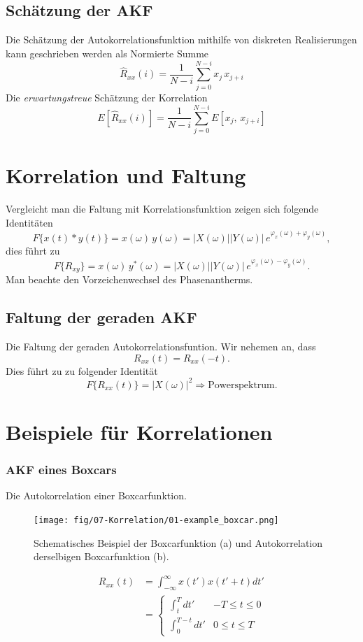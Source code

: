 \subsection{Schätzung der AKF}
Die Schätzung der Autokorrelationsfunktion mithilfe von diskreten Realisierungen kann geschrieben werden als Normierte Summe
\[
\hat R_{xx}(i) = \frac{1}{N-i} \sum_{j=0}^{N-i} x_j\,x_{j+i}
\]
Die \textit{erwartungstreue} Schätzung der Korrelation
\[
E[\hat R_{xx}(i)] = \frac{1}{N-i} \sum_{j=0}^{N-i} E[x_j,\,x_{j+i}]
\]

\section{Korrelation und Faltung}
Vergleicht man die Faltung mit Korrelationsfunktion zeigen sich folgende Identitäten
\[
F\{x(t) \ast y(t)\} = x(\omega)\,y(\omega) = |X(\omega)| |Y(\omega)|\,e^{\varphi_x(\omega) + \varphi_y(\omega)},
\]
dies führt zu
\[
F\{R_{xy}\} = x(\omega)\,y^*(\omega) = |X(\omega)| |Y(\omega)|\,e^{\varphi_x(\omega) - \varphi_y(\omega)}.
\]
Man beachte den Vorzeichenwechsel des Phasenantherms.

\subsection*{Faltung der geraden AKF}
Die Faltung der geraden Autokorrelationsfuntion. Wir nehemen an, dass
\[
R_{xx}(t) = R_{xx}(-t).
\]
Dies führt zu zu folgender Identität
\[
F\{R_{xx}(t)\} = |X(\omega)|^2 \Rightarrow \textrm{Powerspektrum}.
\]

\section{Beispiele für Korrelationen}

\subsubsection*{AKF eines Boxcars}
Die Autokorrelation einer Boxcarfunktion.
\begin{figure}[h!]
\centering
\texttt{[image: fig/07-Korrelation/01-example\_boxcar.png]}
\caption{Schematisches Beispiel der Boxcarfunktion (a) und Autokorrelation derselbigen Boxcarfunktion (b).}
\end{figure}
\begin{align*}
R_{xx}(t) & = \int_{-\infty}^\infty x(t') x(t'+t) dt' \\
& = \begin{cases}
 \int_t^T dt' & -T \leq t \leq 0\\
 \int_0^{T-t} dt' & 0  \leq t \leq T\
 \end{cases}
\end{align*}


